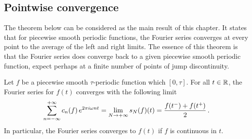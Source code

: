 \subsection{Pointwise convergence}
The theorem below can be considered as the main result of this chapter. It states that
for piecewise smooth periodic functions, the Fourier series converges at every point to
the average of the left and right limits. The essence of this theorem is that the Fourier
series does converge back to a given piecewise smooth periodic function, expect perhaps
at a finite number of points of jump discontinuity.
\begin{theorem}
	\label{thm:fourier-pt}
	Let $f$ be a piecewise smooth $\tau$-periodic function which $[0,\tau]$. For all
	$t\in\mathbb{R}$, the Fourier series for $f(t)$ converges with the following limit
	\begin{equation}
		\sum_{n=-\infty}^{+\infty}c_n(f)\,e^{2\pi i \omega nt}=\lim_{N\to+\infty}s_N(f)(t)
		=\frac{f(t^-)+f(t^+)}{2}\,.
	\end{equation}
	In particular, the Fourier series converges to $f(t)$ if $f$ is continuous in $t$.
\end{theorem}

